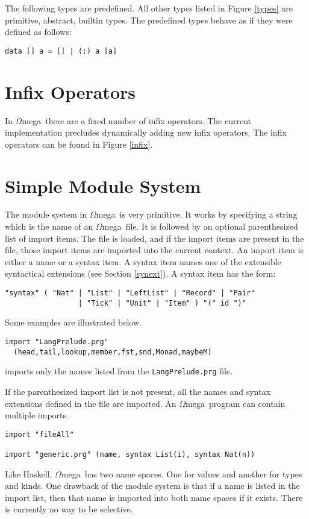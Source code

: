 \documentclass[11pt,twoside]{article}
\newcommand{\om}{$\Omega$mega}
\begin{document}
The following types are predefined. All other types listed in Figure \ref{types}
are primitive, abstract, builtin types. The
predefined types behave as if they were defined as follows:



\begin{verbatim}
data [] a = [] | (:) a [a]
\end{verbatim}

\section{Infix Operators} \label{op}
In \om\ there are a fixed number of infix operators. The current implementation
precludes dynamically adding new infix operators. The infix operators can be
found in Figure \ref{infix}.


\section{Simple Module System} \label{module}
The module system in \om\ is very primitive. It works by specifying
a string which is the name of an \om\ file. It is followed
by an optional parenthesized list of import items. The file is loaded, and 
if the import items are present in the file, those import items
are imported into the current context. An import item is either a name
or a syntax item. A syntax item names one of the extensible syntactical extensions
(see Section \ref{synext}). A syntax
item has the form: 
\begin{verbatim}
"syntax" ( "Nat" | "List" | "LeftList" | "Record" | "Pair"
                 | "Tick" | "Unit" | "Item" ) "(" id ")"
\end{verbatim}
Some examples are illustrated below.
\begin{verbatim}
import "LangPrelude.prg" 
  (head,tail,lookup,member,fst,snd,Monad,maybeM)
\end{verbatim}
imports only the names listed from the {\tt LangPrelude.prg} file.

If the parenthesized import list is not present, all the names and syntax
extensions defined in the file are imported.
An \om\ program can contain multiple imports. 
\begin{verbatim}
import "fileAll"

import "generic.prg" (name, syntax List(i), syntax Nat(n))
\end{verbatim}

Like Haskell, \om\ has
two name spaces. One for values and another for types and kinds. One drawback
of the module system is that if a name is listed in the import list, then
that name is imported into both name spaces if it exists. There is currently
no way to be selective.
\end{document}
